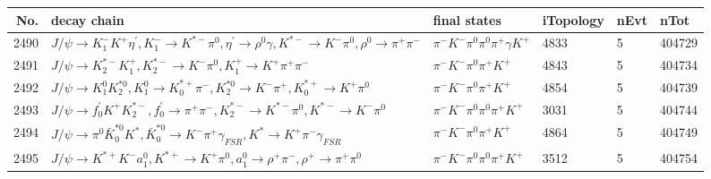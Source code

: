 \begin{table}[htbp] 
\begin{center}
\begin{small}
\begin{tabular}{rlllll}\hline\hline
 No. & decay chain & final states &  iTopology & nEvt & nTot \\\hline
2490&$J/\psi       \rightarrow K_{1}^{-}      K^{+}          \eta^{\prime} , K_{1}^{-}       \rightarrow K^{*-}         \pi^{0}        , \eta^{\prime}  \rightarrow \rho^{0}      \gamma       , K^{*-}          \rightarrow K^{-}          \pi^{0}        , \rho^{0}       \rightarrow \pi^{+}        \pi^{-}        $&$\pi^{-}        K^{-}          \pi^{0}        \pi^{0}        \pi^{+}        \gamma       K^{+}          $& 4833&    5&404729\\
2491&$J/\psi       \rightarrow K_2^{*-}       K_1^{+}        , K_2^{*-}        \rightarrow K^{-}          \pi^{0}        , K_1^{+}         \rightarrow K^{+}          \pi^{+}        \pi^{-}        $&$\pi^{-}        K^{-}          \pi^{0}        \pi^{+}        K^{+}          $& 4843&    5&404734\\
2492&$J/\psi       \rightarrow K_1^{0}        K_2^{*0}       , K_1^{0}         \rightarrow K_{0}^{*+}     \pi^{-}        , K_2^{*0}        \rightarrow K^{-}          \pi^{+}        , K_{0}^{*+}      \rightarrow K^{+}          \pi^{0}        $&$\pi^{-}        K^{-}          \pi^{0}        \pi^{+}        K^{+}          $& 4854&    5&404739\\
2493&$J/\psi       \rightarrow f^{'}_{0}     K^{+}          K_2^{*-}       , f^{'}_{0}      \rightarrow \pi^{+}        \pi^{-}        , K_2^{*-}        \rightarrow K^{*-}         \pi^{0}        , K^{*-}          \rightarrow K^{-}          \pi^{0}        $&$\pi^{-}        K^{-}          \pi^{0}        \pi^{0}        \pi^{+}        K^{+}          $& 3031&    5&404744\\
2494&$J/\psi       \rightarrow \pi^{0}        \bar{K}_0^{*0}K^{*}          , \bar{K}_0^{*0} \rightarrow K^{-}          \pi^{+}        \gamma_{FSR} , K^{*}           \rightarrow K^{+}          \pi^{-}        \gamma_{FSR} $&$\pi^{-}        K^{-}          \pi^{0}        \pi^{+}        K^{+}          $& 4864&    5&404749\\
2495&$J/\psi       \rightarrow K^{*+}         K^{-}          a_{1}^{0}      , K^{*+}          \rightarrow K^{+}          \pi^{0}        , a_{1}^{0}       \rightarrow \rho^{+}      \pi^{-}        , \rho^{+}       \rightarrow \pi^{+}        \pi^{0}        $&$\pi^{-}        K^{-}          \pi^{0}        \pi^{0}        \pi^{+}        K^{+}          $& 3512&    5&404754\\

\end{tabular}
\end{small}
\end{center}
\end{table}

